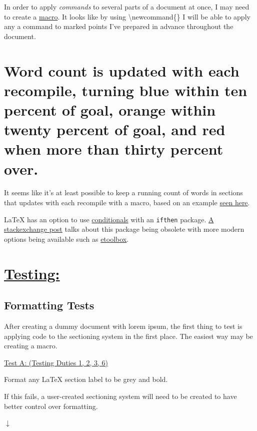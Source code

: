 \documentclass[12pt]{article}
\begin{document}
In order to apply \textit{commands} to several parts of a document at once, I may need to create a \href{https://en.wikibooks.org/wiki/LaTeX/Macros}{macro}. It looks like by using \textbackslash newcommand\{\} I will be able to apply any a command to marked points I've prepared in advance throughout the document.

\section{\large Word count is updated with each recompile, turning blue within ten percent of goal, orange within twenty percent of goal, and red when more than thirty percent over.}

It seems like it's at least possible to keep a running count of words in sections that updates with each recompile with a macro, based on an example \href{https://tex.stackexchange.com/a/44626}{seen here}.

LaTeX has an option to use \href{https://en.wikibooks.org/wiki/LaTeX/Macros#Conditionals}{conditionals} with an \texttt{ifthen} package. \href{https://tex.stackexchange.com/questions/13866/why-is-the-ifthen-package-obsolete}{A stackexchange post} talks about this package being obsolete with more modern options being available such as \href{https://ctan.org/pkg/etoolbox}{etoolbox}.

\vspace{1em}
\section*{\underline{\Large{\textbf{Testing:}}}}

\subsection*{Formatting Tests}

After creating a dummy document with lorem ipsum, the first thing to test is applying code to the sectioning system in the first place. The easiest way may be creating a macro. 

\vspace{0.5em}
\underline{Test A: (Testing Duties 1, 2, 3, 6)}

Format any LaTeX section label to be grey and bold.

If this fails, a user-created sectioning system will need to be created to have better control over formatting.

$\downarrow$
\end{document}

